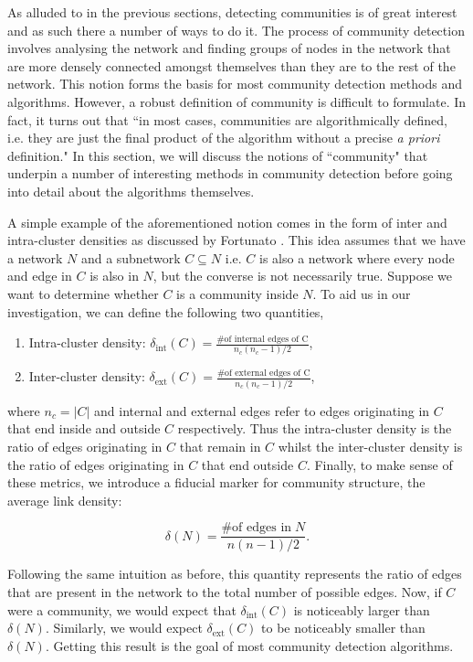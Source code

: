 As alluded to in the previous sections, detecting communities is of great interest and as such there a number of ways to do it. The process of community detection involves analysing the network and finding groups of nodes in the network that are more densely connected amongst themselves than they are to the rest of the network. This notion forms the basis for most community detection methods and algorithms. However, a robust definition of community is difficult to formulate. In fact, it turns out that ``in most cases, communities are algorithmically defined, i.e. they are just the final product of the algorithm without a precise \emph{a priori} definition." \cite[p. 84]{fortunato} In this section, we will discuss the notions of ``community" that underpin a number of interesting methods in community detection before going into detail about the algorithms themselves.

A simple example of the aforementioned notion comes in the form of inter and intra-cluster densities as discussed by Fortunato \cite[p. 84]{fortunato}. This idea assumes that we have a network $N$ and a subnetwork $C \subseteq N$ i.e. $C$ is also a network where every node and edge in $C$ is also in $N$, but the converse is not necessarily true. Suppose we want to determine whether $C$ is a community inside $N$. To aid us in our investigation, we can define the following two quantities,

\begin{enumerate}
    \item Intra-cluster density: $\delta_{\text{int}}(C) = \frac{\text{\# of internal edges of C}}{n_c(n_c - 1)/2} $,
    \item Inter-cluster density: $\delta_{\text{ext}}(C) = \frac{\text{\# of external edges of C}}{n_c(n_c - 1)/2} $,
\end{enumerate}

where $n_c = |C|$ and internal and external edges refer to edges originating in $C$ that end inside and outside $C$ respectively. Thus the intra-cluster density is the ratio of edges originating in $C$ that remain in $C$ whilst the inter-cluster density is the ratio of edges originating in $C$ that end outside $C$. Finally, to make sense of these metrics, we introduce a fiducial marker for community structure, the average link density:

$$ \delta(N) = \frac{\text{\# of edges in}\; N}{n(n-1)/2}. $$

Following the same intuition as before, this quantity represents the ratio of edges that are present in the network to the total number of possible edges. Now, if $C$ were a community, we would expect that $\delta_{\text{int}}(C)$ is noticeably larger than $\delta(N)$. Similarly, we would expect $\delta_{\text{ext}}(C)$ to be noticeably smaller than $\delta(N)$. Getting this result is the goal of most community detection algorithms.

